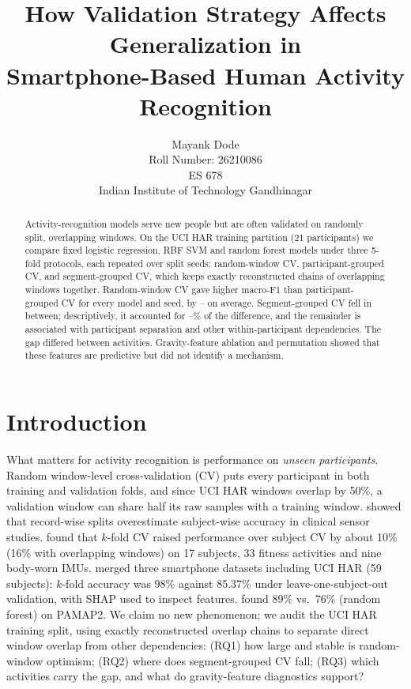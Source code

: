 \documentclass{article}
\title{How Validation Strategy Affects Generalization in\\Smartphone-Based Human Activity Recognition}
\author{%
  Mayank Dode \\
  Roll Number: 26210086 \\
  ES 678 \\
  Indian Institute of Technology Gandhinagar
}
\begin{document}
\maketitle

\begin{abstract}
Activity-recognition models serve new people but are often validated on randomly split, overlapping windows. On the UCI HAR training partition (21 participants) we compare fixed logistic regression, RBF SVM and random forest models under three 5-fold protocols, each repeated over \Nnseeds{} split seeds: random-window CV, participant-grouped CV, and segment-grouped CV, which keeps exactly reconstructed chains of overlapping windows together. Random-window CV gave higher macro-F1 than participant-grouped CV for every model and seed, by \Ngapmodelmin--\Ngapmodelmax{} on average. Segment-grouped CV fell in between; descriptively, it accounted for \Noverlapsharemin--\Noverlapsharemax\% of the difference, and the remainder is associated with participant separation and other within-participant dependencies. The gap differed between activities. Gravity-feature ablation and permutation showed that these features are predictive but did not identify a mechanism.
\end{abstract}

\section{Introduction}
What matters for activity recognition is performance on \emph{unseen participants}. Random window-level cross-validation (CV) puts every participant in both training and validation folds, and since UCI HAR windows overlap by 50\%, a validation window can share half its raw samples with a training window. \citet{saeb2017} showed that record-wise splits overestimate subject-wise accuracy in clinical sensor studies. \citet{dehghani2019} found that $k$-fold CV raised performance over subject CV by about 10\% (16\% with overlapping windows) on 17 subjects, 33 fitness activities and nine body-worn IMUs. \citet{braganca2022} merged three smartphone datasets including UCI HAR (59 subjects): $k$-fold accuracy was 98\% against 85.37\% under leave-one-subject-out validation, with SHAP used to inspect features. \citet{rehman2024} found 89\% vs.\ 76\% (random forest) on PAMAP2. We claim no new phenomenon; we audit the UCI HAR training split, using exactly reconstructed overlap chains to separate direct window overlap from other dependencies: (RQ1) how large and stable is random-window optimism; (RQ2) where does segment-grouped CV fall; (RQ3) which activities carry the gap, and what do gravity-feature diagnostics support?
\end{document}
